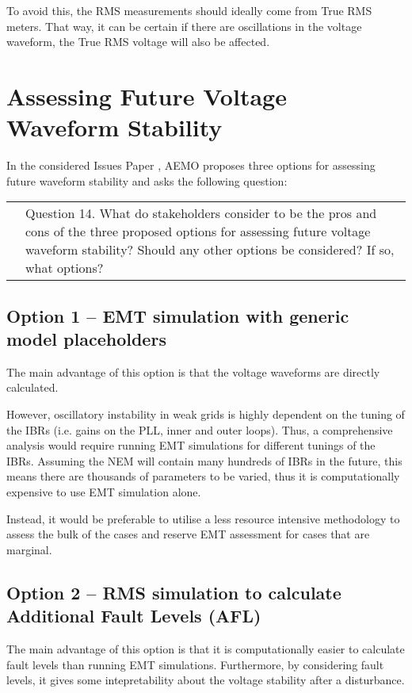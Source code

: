 \documentclass[11pt,a4paper,]{article}
\begin{document}
To avoid this, the RMS measurements should ideally come from True RMS meters. That way, it can be certain if there are oscillations in the voltage waveform, the True RMS voltage will also be affected.

\newpage

\section{Assessing Future Voltage Waveform Stability}

In the considered Issues Paper \cite{aemossrmiag}, AEMO proposes three options for assessing future waveform stability and asks the following question:

\begin{tabular}{l|p{}}
\quad & Question 14. What do stakeholders consider to be the pros and cons of the three proposed options for assessing future voltage waveform stability? Should any other options be considered? If so, what options?
\end{tabular}

\subsection{Option 1 -- EMT simulation with generic model placeholders}
The main advantage of this option is that the voltage waveforms are directly calculated.

However, oscillatory instability in weak grids is highly dependent on the tuning of the IBRs (i.e. gains on the PLL, inner and outer loops). Thus, a comprehensive analysis would require running EMT simulations for different tunings of the IBRs. Assuming the NEM will contain many hundreds of IBRs in the future, this means there are thousands of parameters to be varied, thus it is computationally expensive to use EMT simulation alone.

Instead, it would be preferable to utilise a less resource intensive methodology to assess the bulk of the cases and reserve EMT assessment for cases that are marginal.

\subsection{Option 2 -- RMS simulation to calculate Additional Fault Levels (AFL)}
The main advantage of this option is that it is computationally easier to calculate fault levels than running EMT simulations. Furthermore, by considering fault levels, it gives some intepretability about the voltage stability after a disturbance.
\end{document}
